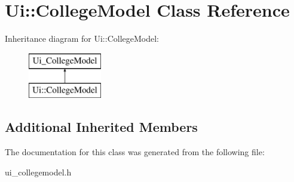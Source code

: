 \hypertarget{class_ui_1_1_college_model}{}\section{Ui\+:\+:College\+Model Class Reference}
\label{class_ui_1_1_college_model}
Inheritance diagram for Ui\+:\+:College\+Model\+:\begin{figure}[H]
\begin{center}
\leavevmode
\includegraphics[height=2.000000cm]{class_ui_1_1_college_model}
\end{center}
\end{figure}
\subsection*{Additional Inherited Members}


The documentation for this class was generated from the following file\+:\begin{DoxyCompactItemize}
\item 
ui\+\_\+collegemodel.\+h\end{DoxyCompactItemize}
